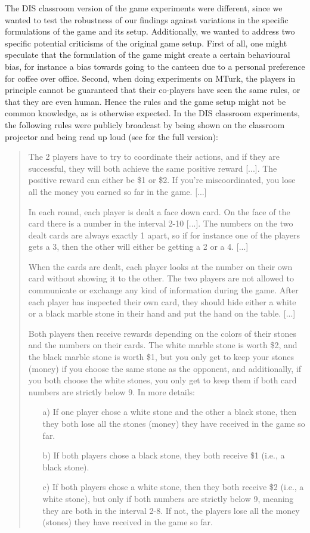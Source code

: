 The DIS classroom version of the game experiments were different, since we wanted to test the robustness of our findings against variations in the specific formulations of the game and its setup. Additionally, we wanted to address two specific potential criticisms of the original game setup. First of all, one might speculate that the formulation of the game might create a certain behavioural bias, for instance a bias towards going to the canteen due to a personal preference for coffee over office. Second, when doing experiments on MTurk, the players  in principle cannot be guaranteed that their co-players have seen the same rules, or that they are even human. Hence the rules and the game setup might not be common knowledge, as is otherwise expected. In the DIS classroom experiments, the following rules were publicly broadcast by being shown on the classroom projector and being read up loud (see  for the full version): 
\begin{quote}
\indent
The 2 players have to try to coordinate their actions, and if they are successful, they will both achieve the same positive reward [...]. The positive reward can either be \$1 or \$2. If you’re miscoordinated, you lose all the money you earned so far in the game. [...] 
  
In each round, each player is dealt a face down card. On the face of the card there is a number in the interval 2-10 [...]. The numbers on the two dealt cards are always exactly 1 apart, so if for instance one of the players gets a 3, then the other will either be getting a 2 or a 4. [...] 

When the cards are dealt, each player looks at the number on their own card without showing it to the other. The two players are not allowed to communicate or exchange any kind of information during the game. After each player has inspected their own card, they should hide either a white or a black marble stone in their hand and put the hand on the table. [...] 

Both players then receive rewards depending on the colors of their stones and the numbers on their cards. The white marble stone is worth \$2, and the black marble stone is worth \$1, but you only get to keep your stones (money) if you choose the same stone as the opponent, and additionally, if you both choose the white stones, you only get to keep them if both card numbers are strictly below 9. In more details:  
\begin{enumerate}
  \item[a)] If one player chose a white stone and the other a black stone, then they both lose all the stones (money) they have received in the game so far.    
  \item[b)] If both players chose a black stone, they both receive \$1 (i.e., a black stone). 
  \item[c)] If both players chose a white stone, then they both receive \$2 (i.e., a white stone), but only if both numbers are strictly below 9, meaning they are both in the interval 2-8. If not, the players lose all the money (stones) they have received in the game so far.
\end{enumerate}
\end{quote}
